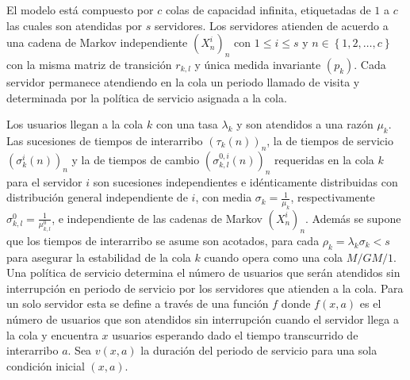 El modelo est\'a compuesto por $c$ colas de capacidad infinita,
etiquetadas de $1$ a $c$ las cuales son atendidas por $s$
servidores. Los servidores atienden de acuerdo a una cadena de
Markov independiente $\left(X^{i}_{n}\right)_{n}$ con $1\leq i\leq
s$ y $n\in\left\{1,2,\ldots,c\right\}$ con la misma matriz de
transici\'on $r_{k,l}$ y \'unica medida invariante
$\left(p_{k}\right)$. Cada servidor permanece atendiendo en la
cola un periodo llamado de visita y determinada por la pol\'itica de
servicio asignada a la cola.

Los usuarios llegan a la cola $k$ con una tasa $\lambda_{k}$ y son
atendidos a una raz\'on $\mu_{k}$. Las sucesiones de tiempos de
interarribo $\left(\tau_{k}\left(n\right)\right)_{n}$, la de
tiempos de servicio
$\left(\sigma_{k}^{i}\left(n\right)\right)_{n}$ y la de tiempos de
cambio $\left(\sigma_{k,l}^{0,i}\left(n\right)\right)_{n}$
requeridas en la cola $k$ para el servidor $i$ son sucesiones
independientes e id\'enticamente distribuidas con distribuci\'on
general independiente de $i$, con media
$\sigma_{k}=\frac{1}{\mu_{k}}$, respectivamente
$\sigma_{k,l}^{0}=\frac{1}{\mu_{k,l}^{0}}$, e independiente de las
cadenas de Markov $\left(X^{i}_{n}\right)_{n}$. Adem\'as se supone
que los tiempos de interarribo se asume son acotados, para cada
$\rho_{k}=\lambda_{k}\sigma_{k}<s$ para asegurar la estabilidad de
la cola $k$ cuando opera como una cola $M/GM/1$.
Una pol\'itica de servicio determina el n\'umero de usuarios que ser\'an
atendidos sin interrupci\'on en periodo de servicio por los
servidores que atienden a la cola. Para un solo servidor esta se
define a trav\'es de una funci\'on $f$ donde $f\left(x,a\right)$ es el
n\'umero de usuarios que son atendidos sin interrupci\'on cuando el
servidor llega a la cola y encuentra $x$ usuarios esperando dado
el tiempo transcurrido de interarribo $a$. Sea $v\left(x,a\right)$
la duraci\'on del periodo de servicio para una sola condici\'on
inicial $\left(x,a\right)$.

